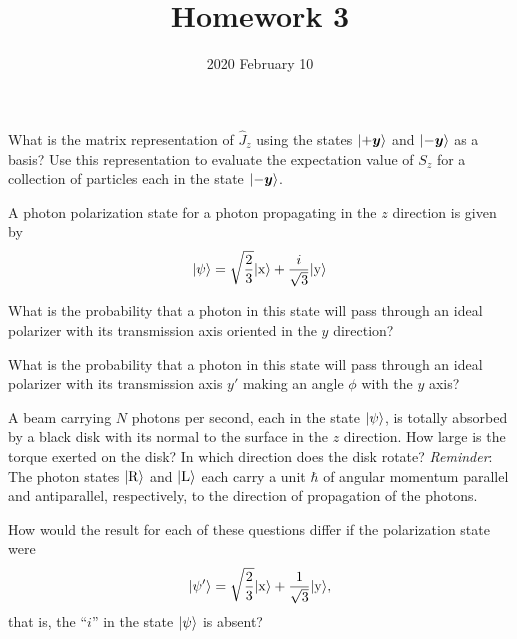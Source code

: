 \documentclass{../phys116}
\title{Homework 3}
\author{}
\date{2020 February 10}
\begin{document}
\begin{exercise}
  What is the matrix representation of \(\hat J_z\) using the states
  \(\ket{+\vec y}\) and \(\ket{-\vec y}\) as a basis?  Use this
  representation to evaluate the expectation value of \(S_z\) for a
  collection of particles each in the state \(\ket{-\vec y}\).
\end{exercise}

\begin{solution}
\end{solution}

\begin{exercise}
  A photon polarization state for a photon propagating in the \(z\)
  direction is given by
  \[
    \lvert\psi\rangle
    = \sqrt{\frac 2 3} \lvert\mathrm x\rangle
    + \frac i {\sqrt 3} \lvert\mathrm y\rangle
  \]
  \begin{problems}
  \item What is the probability that a photon in this state will pass
    through an ideal polarizer with its transmission axis oriented in
    the \(y\) direction?

  \item What is the probability that a photon in this state will pass
    through an ideal polarizer with its transmission axis \(y'\)
    making an angle \(\phi\) with the \(y\) axis?

  \item A beam carrying \(N\) photons per second, each in the state
    \(\lvert\psi\rangle\), is totally absorbed by a black disk with its normal
    to the surface in the \(z\) direction.  How large is the torque
    exerted on the disk?  In which direction does the disk rotate?
    \textit{Reminder}: The photon states \(\lvert\mathrm R\rangle\) and
    \(\lvert\mathrm L\rangle\) each carry a unit \(\hbar\) of angular
    momentum parallel and antiparallel, respectively, to the direction
    of propagation of the photons.

  \item How would the result for each of these questions differ if the
    polarization state were
    \[
      \lvert\psi'\rangle
      = \sqrt{\frac 2 3} \lvert\mathrm x\rangle
      + \frac{1}{\sqrt 3} \lvert\mathrm y\rangle,
    \]
    that is, the ``\(i\)'' in the state \(\lvert\psi\rangle\) is absent?
  \end{problems}
\end{exercise}

\begin{solution}
  \begin{problems}
  \item
  \item
  \item
  \item
  \end{problems}
\end{solution}
\end{document}
